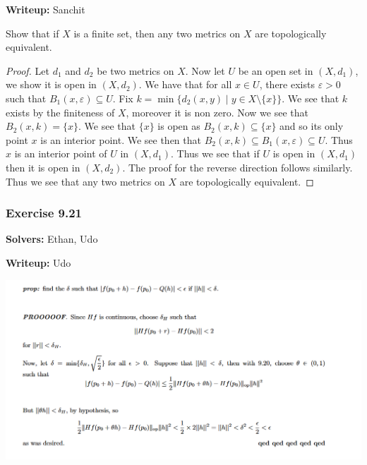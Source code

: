 \documentclass{article}
\theoremstyle{plain} %
\numberwithin{thm}{section} %
\theoremstyle{definition}
\begin{document}
    \textbf{Writeup:} Sanchit

    Show that if $X$ is a finite set, then any two metrics on $X$ are topologically equivalent.

    \begin{proof}
        Let $d_1$ and $d_2$ be two metrics on $X$. Now let $U$ be an open set in $(X,d_1)$, we show it is open in $(X,d_2)$. We have that for all $x \in U$, there exists $\varepsilon > 0$ such that $B_1(x, \varepsilon) \subseteq U$. Fix $k = \min\{d_2(x,y) \mid y \in X \setminus \{x\}\}$. We see that $k$ exists by the finiteness of $X$, moreover it is non zero. Now we see that $B_2(x,k) = \{x\}$. We see that $\{x\}$ is open as $B_2(x,k) \subseteq \{x\}$ and so its only point $x$ is an interior point. We see then that $B_2(x,k) \subseteq B_1(x,\varepsilon) \subseteq U$. Thus $x$ is an interior point of $U$ in $(X,d_1)$. Thus we see that if $U$ is open in $(X,d_1)$ then it is open in $(X,d_2)$. The proof for the reverse direction follows similarly. Thus we see that any two metrics on $X$ are topologically equivalent.
    \end{proof}

    \subsubsection{Exercise 9.21}
    \textbf{Solvers:} Ethan, Udo

    \textbf{Writeup:} Udo

    \includegraphics[scale=0.45]{../images/9.21.png}
\end{document}
